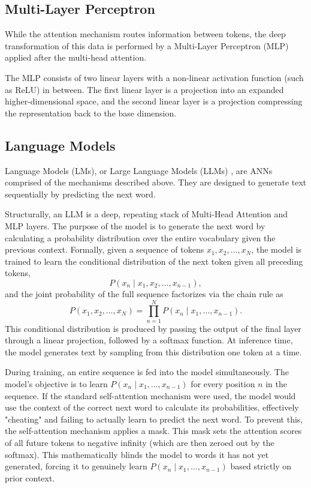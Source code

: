 \subsection*{Multi-Layer Perceptron}

While the attention mechanism routes information between tokens, the deep transformation of this data is performed by a Multi-Layer Perceptron (MLP) applied after the multi-head attention.

The MLP consists of two linear layers with a non-linear activation function (such as ReLU) in between. The first linear layer is a projection into an expanded higher-dimensional space, and the second linear layer is a projection compressing the representation back to the base dimension.

\subsection*{Language Models}

Language Models (LMs), or Large Language Models (LLMs) \cite{devlin2019bertpretrainingdeepbidirectional,radford2018improvinglu}, are ANNs comprised of the mechanisms described above. They are designed to generate text sequentially by predicting the next word.

Structurally, an LLM is a deep, repeating stack of Multi-Head Attention and MLP layers. The purpose of the model is to generate the next word by calculating a probability distribution over the entire vocabulary given the previous context. Formally, given a sequence of tokens $x_1, x_2, \ldots, x_N$, the model is trained to learn the conditional distribution of the next token given all preceding tokens,
$$ P(x_n \mid x_1, x_2, \ldots, x_{n-1}), $$
and the joint probability of the full sequence factorizes via the chain rule as
$$ P(x_1, x_2, \ldots, x_N) = \prod_{n=1}^{N} P(x_n \mid x_1, \ldots, x_{n-1}). $$
This conditional distribution is produced by passing the output of the final layer through a linear projection, followed by a softmax function. At inference time, the model generates text by sampling from this distribution one token at a time.

During training, an entire sequence is fed into the model simultaneously. The model's objective is to learn $P(x_n \mid x_1, \ldots, x_{n-1})$ for every position $n$ in the sequence. If the standard self-attention mechanism were used, the model would use the context of the correct next word to calculate its probabilities, effectively "cheating" and failing to actually learn to predict the next word. To prevent this, the self-attention mechanism applies a mask. This mask sets the attention scores of all future tokens to negative infinity (which are then zeroed out by the softmax). This mathematically blinds the model to words it has not yet generated, forcing it to genuinely learn $P(x_n \mid x_1, \ldots, x_{n-1})$ based strictly on prior context.

